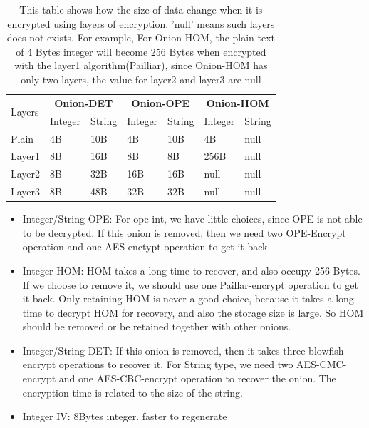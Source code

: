 \begin{table}
\renewcommand{\arraystretch}{1.3}

\label{tab:encryption-size}
\begin{tabular}{p{0.8cm}|p{0.8cm}p{0.8cm}|p{0.8cm}p{0.8cm}|p{0.8cm}p{0.8cm}}%
\toprule
\multirow{2}{2cm}{Layers} & \multicolumn{2}{c}{\textbf{Onion-DET}} & \multicolumn{2}{c}{\textbf{Onion-OPE}} & \multicolumn{2}{c}{\textbf{Onion-HOM}}\\
\cmidrule{2-7}
& Integer & String & Integer & String & Integer & String\\
\midrule
Plain & 4B & 10B & 4B & 10B & 4B & null \\
Layer1 & 8B & 16B & 8B & 8B & 256B & null \\
Layer2 & 8B & 32B & 16B & 16B & null & null \\
Layer3 & 8B & 48B & 32B & 32B & null & null \\
\bottomrule
\end{tabular}
\caption{This table shows how the size of data change when it is encrypted using layers of encryption. 'null' means such layers does not exists. For example, For Onion-HOM, the plain text of 4 Bytes integer will become 256 Bytes when encrypted with the layer1 algorithm(Pailliar), since Onion-HOM has only two layers, the value for layer2 and layer3 are null}
\end{table}


\begin{itemize}
\item Integer/String OPE: For ope-int, we have little choices, since OPE is not able to be decrypted. If this onion is removed, then we need two OPE-Encrypt operation and one AES-enctypt operation to get it back. 
\item Integer HOM: HOM takes a long time to recover, and also occupy 256 Bytes. If we choose to remove it, we should use one Paillar-encrypt operation to get it back. Only retaining HOM is never a good choice, because it takes a long time to decrypt HOM for recovery, and also the storage size is large. So HOM should be removed or be retained together with other onions.
\item Integer/String DET: If this onion is removed, then it takes three blowfish-encrypt operations to recover it. For String type, we need two AES-CMC-encrypt and one AES-CBC-encrypt operation to recover the onion. The encryption time is related to the size of the string.
\item Integer IV: 8Bytes integer. faster to regenerate
\end{itemize}


